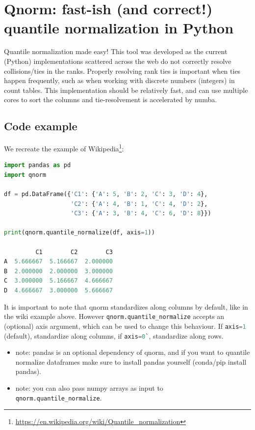 \chapter{Qnorm: fast-ish (and correct!) quantile normalization in Python}\thumbforchapter
{}
\newpage
{}

Quantile normalization made easy! This tool was developed as the current (Python) implementations scattered across the web do not correctly resolve collisions/ties in the ranks. Properly resolving rank ties is important when ties happen frequently, such as when working with discrete numbers (integers) in count tables. This implementation should be relatively fast, and can use multiple cores to sort the columns and tie-resolvement is accelerated by numba.

\section{Code example}

We recreate the example of Wikipedia\footnote{\url{https://en.wikipedia.org/wiki/Quantile_normalization}}:

\begin{lstlisting}[language=Python]
import pandas as pd
import qnorm

df = pd.DataFrame({'C1': {'A': 5, 'B': 2, 'C': 3, 'D': 4},
                   'C2': {'A': 4, 'B': 1, 'C': 4, 'D': 2},
                   'C3': {'A': 3, 'B': 4, 'C': 6, 'D': 8}})

print(qnorm.quantile_normalize(df, axis=1))

         C1        C2        C3
A  5.666667  5.166667  2.000000
B  2.000000  2.000000  3.000000
C  3.000000  5.166667  4.666667
D  4.666667  3.000000  5.666667
\end{lstlisting}

It is important to note that qnorm standardizes along columns by default, like in the wiki example above. However \lstinline[language=Python]{qnorm.quantile_normalize} accepts an (optional) axis argument, which can be used to change this behaviour. If \lstinline[language=Python]{axis=1} (default), standardize along columns, if \lstinline[language=Python]{axis=0`}, standardize along rows.

\begin{itemize}
    \item note: pandas is an optional dependency of qnorm, and if you want to quantile normalize dataframes make sure to install pandas yourself (conda/pip install pandas).

    \item note: you can also pass numpy arrays as input to \lstinline[language=Python]{qnorm.quantile_normalize}.
\end{itemize}

